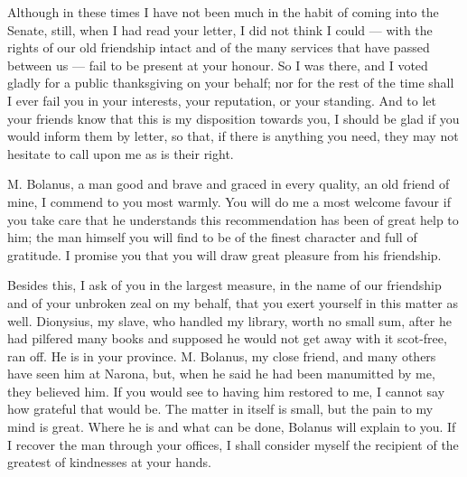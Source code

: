 

 Although in these times I have not been much in the habit of coming into the Senate, still, when I had read your letter, I did not think I could --- with the rights of our old friendship intact and of the many services that have passed between us --- fail to be present at your honour. So I was there, and I voted gladly for a public thanksgiving on your behalf; nor for the rest of the time shall I ever fail you in your interests, your reputation, or your standing. And to let your friends know that this is my disposition towards you, I should be glad if you would inform them by letter, so that, if there is anything you need, they may not hesitate to call upon me as is their right.

 M. Bolanus, a man good and brave and graced in every quality, an old friend of mine, I commend to you most warmly. You will do me a most welcome favour if you take care that he understands this recommendation has been of great help to him; the man himself you will find to be of the finest character and full of gratitude. I promise you that you will draw great pleasure from his friendship.

 Besides this, I ask of you in the largest measure, in the name of our friendship and of your unbroken zeal on my behalf, that you exert yourself in this matter as well. Dionysius, my slave, who handled my library, worth no small sum, after he had pilfered many books and supposed he would not get away with it scot-free, ran off. He is in your province. M. Bolanus, my close friend, and many others have seen him at Narona, but, when he said he had been manumitted by me, they believed him. If you would see to having him restored to me, I cannot say how grateful that would be. The matter in itself is small, but the pain to my mind is great. Where he is and what can be done, Bolanus will explain to you. If I recover the man through your offices, I shall consider myself the recipient of the greatest of kindnesses at your hands.
